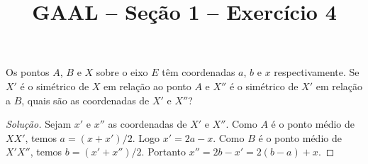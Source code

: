 \documentclass[a4paper,11pt]{article}
\title{GAAL -- Seção 1 -- Exercício 4}
\author{\empty}
\date{\empty}
\newcommand\onlyinsubfileone\maketitle
\begin{document}
\onlyinsubfileone

\begin{exercicio-gaal}[E4.S1]
  Os pontos $A$, $B$ e $X$ sobre o eixo $E$ têm coordenadas $a$, $b$ e $x$ respectivamente.
  Se $X'$ é o simétrico de $X$ em relação ao ponto $A$ e $X''$ é o simétrico de $X'$ em relação a $B$, quais são as coordenadas de $X'$ e $X''$?
\end{exercicio-gaal}

\begin{proof}[Solução]
  Sejam $x'$ e $x''$ as coordenadas de $X'$ e $X''$.
  Como $A$ é o ponto médio de $XX'$, temos $a = (x+x')/2$.
  Logo $x' = 2a - x$.
  Como $B$ é o ponto médio de $X'X''$, temos $b = (x'+x'')/2$.
  Portanto $x'' = 2b - x' = 2(b-a) + x$.
\end{proof}
\end{document}
